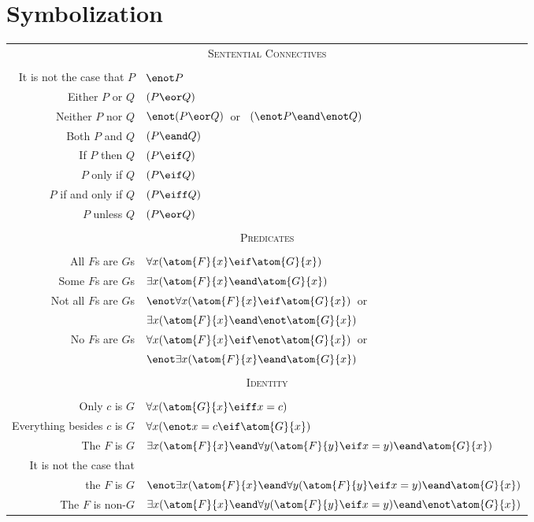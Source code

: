 \section{Symbolization}
\begin{center}
\label{app.symbolization}
\begin{tabular*}{\textwidth}{rl}
\multicolumn{2}{c}{\textsc{Sentential Connectives}}\\ \\
It is not the case that $P$ & $\enot P$\\
Either $P$ or $Q$ & $(P \eor Q)$\\
Neither $P$ nor $Q$ & $\enot(P \eor Q)$\ or \ $(\enot P \eand \enot Q)$\\
Both $P$ and $Q$ & $(P \eand Q)$\\
If $P$ then $Q$ & $(P \eif Q)$\\
$P$ only if $Q$ & $(P \eif Q)$\\
$P$ if and only if $Q$ & $(P \eiff Q)$\\
$P$ unless $Q$ & $(P \eor Q)$\\
\\
\multicolumn{2}{c}{\label{SymbolizingPredicates}\textsc{Predicates}}\\ \\
All $F$s are $G$s & $\forall x(\atom{F}{x} \eif \atom{G}{x})$\\
Some $F$s are $G$s & $\exists x(\atom{F}{x} \eand \atom{G}{x})$\\
Not all $F$s are $G$s & $\enot\forall x(\atom{F}{x} \eif \atom{G}{x})$\ or\\
& $\exists x(\atom{F}{x} \eand \enot \atom{G}{x})$\\
No $F$s are $G$s & $\forall x(\atom{F}{x} \eif\enot \atom{G}{x})$\ or\\
& $\enot\exists x(\atom{F}{x} \eand \atom{G}{x})$\\
\\
\multicolumn{2}{c}{\textsc{Identity}}\\ \\
Only $c$ is $G$ & $\forall x(\atom{G}{x} \eiff x=c)$\\
Everything besides $c$ is $G$ & $\forall x(\enot x = c \eif \atom{G}{x} )$\\
The $F$ is $G$ & $\exists x(\atom{F}{x} \eand \forall y(\atom{F}{y} \eif x=y) \eand \atom{G}{x} )$\\
It is not the case that\\
 the $F$ is $G$ & $\enot\exists x(\atom{F}{x} \eand \forall y(\atom{F}{y} \eif x=y) \eand \atom{G}{x} )$\\
The $F$ is non-$G$ & $\exists x(\atom{F}{x} \eand \forall y(\atom{F}{y} \eif x=y) \eand \enot \atom{G}{x} )$
\end{tabular*}
\end{center}






